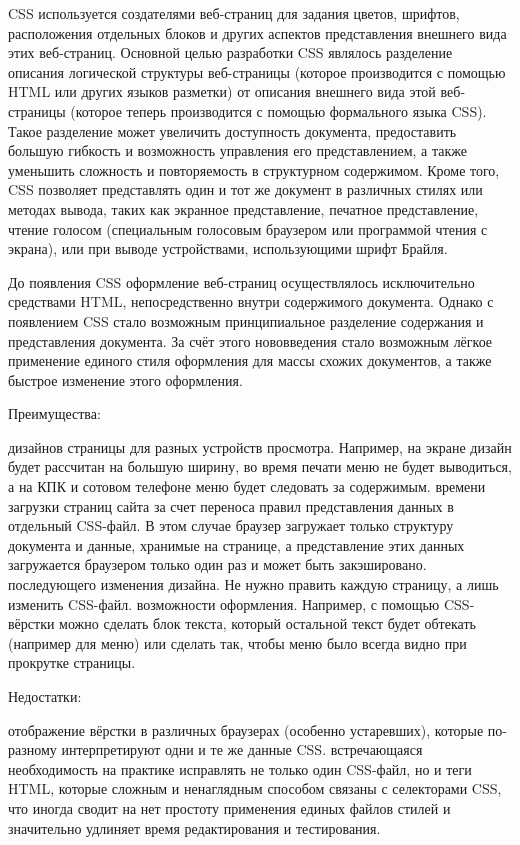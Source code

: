 \documentclass[a4paper]{article}
\begin{document}
CSS используется создателями веб-страниц для задания цветов, шрифтов, расположения отдельных блоков и других аспектов представления внешнего вида этих веб-страниц. Основной целью разработки CSS являлось разделение описания логической структуры веб-страницы (которое производится с помощью HTML или других языков разметки) от описания внешнего вида этой веб-страницы (которое теперь производится с помощью формального языка CSS). Такое разделение может увеличить доступность документа, предоставить большую гибкость и возможность управления его представлением, а также уменьшить сложность и повторяемость в структурном содержимом. Кроме того, CSS позволяет представлять один и тот же документ в различных стилях или методах вывода, таких как экранное представление, печатное представление, чтение голосом (специальным голосовым браузером или программой чтения с экрана), или при выводе устройствами, использующими шрифт Брайля.

До появления CSS оформление веб-страниц осуществлялось исключительно средствами HTML, непосредственно внутри содержимого документа. Однако с появлением CSS стало возможным принципиальное разделение содержания и представления документа. За счёт этого нововведения стало возможным лёгкое применение единого стиля оформления для массы схожих документов, а также быстрое изменение этого оформления.

Преимущества:
\begin{itemize}
 дизайнов страницы для разных устройств просмотра. Например, на экране дизайн будет рассчитан на большую ширину, во время печати меню не будет выводиться, а на КПК и сотовом телефоне меню будет следовать за содержимым.
 времени загрузки страниц сайта за счет переноса правил представления данных в отдельный CSS-файл. В этом случае браузер загружает только структуру документа и данные, хранимые на странице, а представление этих данных загружается браузером только один раз и может быть закэшировано.
 последующего изменения дизайна. Не нужно править каждую страницу, а лишь изменить CSS-файл.
 возможности оформления. Например, с помощью CSS-вёрстки можно сделать блок текста, который остальной текст будет обтекать (например для меню) или сделать так, чтобы меню было всегда видно при прокрутке страницы.
\end{itemize}

Недостатки:
\begin{itemize}
 отображение вёрстки в различных браузерах (особенно устаревших), которые по-разному интерпретируют одни и те же данные CSS.
 встречающаяся необходимость на практике исправлять не только один CSS-файл, но и теги HTML, которые сложным и ненаглядным способом связаны с селекторами CSS, что иногда сводит на нет простоту применения единых файлов стилей и значительно удлиняет время редактирования и тестирования.
\end{itemize}
\end{document}

